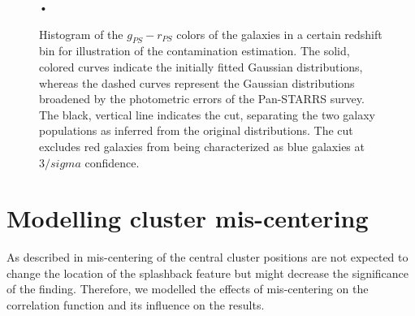 \documentclass[iop, apjl, twocolappendix, numberedappendix]{emulateapj}
\begin{document}
\begin{figure}
\caption{Histogram of the $g_{PS} - r_{PS}$ colors of the galaxies in a certain redshift bin for illustration
of the contamination estimation. The solid, colored curves indicate the initially fitted Gaussian distributions,
whereas the dashed curves represent the Gaussian distributions broadened by the photometric errors of the Pan-STARRS
survey. The black, vertical line indicates the cut, separating the two galaxy populations as inferred from the original
distributions. The cut excludes red galaxies from being characterized as blue galaxies at $3/sigma$ confidence.}
    \label{fig:histogram}•
\end{figure}


\section{Modelling cluster mis-centering}
\label{sec:mis-centering}
As described in \citet{baxter2017halo} mis-centering of the central cluster 
positions are not expected to change the location of the splashback feature 
but might decrease the significance of the finding. Therefore, we modelled the 
effects of mis-centering on the correlation function and its influence on the results. 
\end{document}
